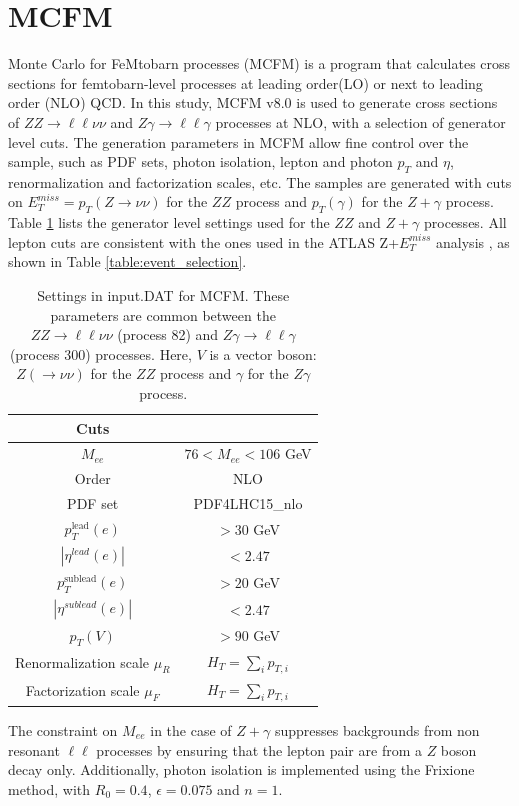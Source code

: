 \documentclass[12pt,a4paper,openright,twoside]{report}
\newcommand{\ZZ}{$ZZ\to \ell\ell\nu\nu$ }
\newcommand{\Zg}{$Z\gamma\to \ell\ell\gamma$ }
\begin{document}
\section{MCFM}\label{sec:MCFM}
Monte Carlo for FeMtobarn processes (MCFM) is a program that calculates cross sections for femtobarn-level processes at leading order(LO) or next to leading order (NLO) QCD. In this study, MCFM v8.0 \cite{MCFM1, MCFM2, MCFM3, MCFM} is used to generate cross sections of \ZZ and \Zg processes at NLO, with a selection of generator level cuts. The generation parameters in MCFM allow fine control over the sample, such as PDF sets, photon isolation, lepton and photon $p_T$ and $\eta$, renormalization and factorization scales, etc. The samples are generated with cuts on $E_T^{miss} = p_T(Z\to \nu\nu)$ for the $ZZ$ process and $p_T(\gamma)$ for the $Z+\gamma$ process. Table \ref{table:default} lists the generator level settings used for the $ZZ$ and $Z+\gamma$ processes. All lepton cuts are consistent with the ones used in the ATLAS Z+$E_T^{miss}$ analysis \cite{ZH_ATLAS}, as shown in Table \ref{table:event_selection}.

{\renewcommand{\arraystretch}{1.5}
\begin{table}[H]
\centering
	\begin{tabular}{c c}
	\hline
	\hline
	\textbf{Cuts} &\\
	\hline
	$M_{ee}$ & $76 < M_{ee} < 106$ GeV\\
	\hline
	Order & NLO \\
	\hline
	PDF set & PDF4LHC15\_nlo\\
	\hline
	$p_T^{\text{lead}}(e)$ & $> 30$ GeV \\
	\hline
	$|\eta^{lead}(e)|$ & $< 2.47$\\
	\hline
	$p_T^{\text{sublead}}(e)$ & $> 20$ GeV\\
	\hline
	$|\eta^{sublead}(e)|$ & $< 2.47$\\
	\hline
	$p_T(V)$\footnotemark & $> 90$ GeV\\
	\hline
	Renormalization scale $\mu_R$& $H_T = \sum_{i}p_{T,i}$\\
	\hline
	Factorization scale $\mu_F$& $H_T = \sum_{i}p_{T,i}$\\
	\hline
	\hline
	\end{tabular}
	\caption{Settings in input.DAT for MCFM. These parameters are common between the \ZZ (process 82) and \Zg (process 300) processes. Here, $V$ is a vector boson: $Z(\to\nu\nu)$ for the $ZZ$ process and $\gamma$ for the $Z\gamma$ process.}
	\label{table:default}
\end{table}
}
The constraint on $M_{ee}$ in the case of $Z+\gamma$ suppresses backgrounds from non resonant $\ell\ell$ processes by ensuring that the lepton pair are from a $Z$ boson decay only. Additionally, photon isolation is implemented using the Frixione \cite{frixione} method, with $R_0=0.4$, $\epsilon=0.075$ and $n=1$.
\end{document}
